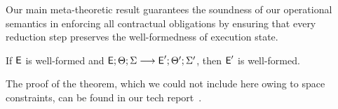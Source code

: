 Our main meta-theoretic result guarantees the soundness of our operational
semantics in enforcing all contractual obligations by ensuring that every
reduction step preserves the well-formedness of execution state.

\begin{theorem}
\label{lem:core-preservation}
If ${\normalfont \textsf{E}}$ is well-formed and ${\normalfont \textsf{E}}; \Theta; \Sigma \longrightarrow {\normalfont \textsf{E}}'; \Theta';
\Sigma'$, then ${\normalfont \textsf{E}}'$ is well-formed.
\end{theorem}
%

The proof of the theorem, which we could not include here owing to space
constraints, can be found in our tech report~\cite{techrep}.

